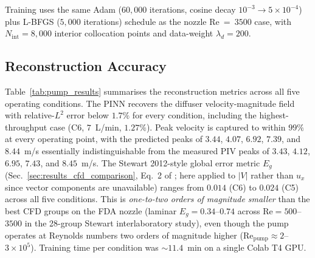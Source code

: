 \documentclass[12pt,a4paper]{article}
\newcommand{\Reyn}{\mathrm{Re}}    %
\begin{document}
Training uses the same Adam ($60{,}000$ iterations, cosine
decay $10^{-3} \to 5 \times 10^{-4}$) plus L-BFGS ($5{,}000$
iterations) schedule as the nozzle Re~=~$3500$ case, with
$N_{\text{int}} = 8{,}000$ interior collocation points and
data-weight $\lambda_d = 200$.

\subsection{Reconstruction Accuracy}
\label{sec:pump_accuracy}

Table~\ref{tab:pump_results} summarises the reconstruction
metrics across all five operating conditions. The PINN
recovers the diffuser velocity-magnitude field with
relative-$L^2$ error below $1.7\%$ for every condition,
including the highest-throughput case (C6, $7$~L/min, $1.27\%$).
Peak velocity is captured to within $99\%$ at every operating
point, with the predicted peaks of $3.44$, $4.07$, $6.92$,
$7.39$, and $8.44$~m/s essentially indistinguishable from the
measured PIV peaks of $3.43$, $4.12$, $6.95$, $7.43$, and
$8.45$~m/s. The Stewart 2012-style global error metric $E_g$
(Sec.~\ref{sec:results_cfd_comparison}, Eq.~2 of
\cite{Stewart2012FDA}; here applied to $|V|$ rather than $u_x$
since vector components are unavailable) ranges from $0.014$
(C6) to $0.024$ (C5) across all five conditions. This is
\emph{one-to-two orders of magnitude smaller} than the best
CFD groups on the FDA nozzle (laminar $E_g = 0.34$--$0.74$
across $\Reyn = 500$--$3500$ in the 28-group Stewart
interlaboratory study), even though the pump operates at
Reynolds numbers two orders of magnitude higher
($\text{Re}_{\text{pump}} \approx 2$--$3 \times 10^5$).
Training time per condition was $\sim\!11.4$~min on a single
Colab T4 GPU.
\end{document}
